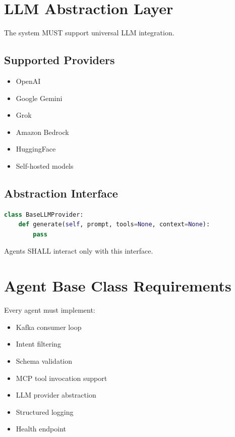 \documentclass[12pt]{article}
\begin{document}
\section{LLM Abstraction Layer}

The system MUST support universal LLM integration.

\subsection{Supported Providers}

\begin{itemize}
    \item OpenAI
    \item Google Gemini
    \item Grok
    \item Amazon Bedrock
    \item HuggingFace
    \item Self-hosted models
\end{itemize}

\subsection{Abstraction Interface}

\begin{lstlisting}[language=Python]
class BaseLLMProvider:
    def generate(self, prompt, tools=None, context=None):
        pass
\end{lstlisting}

Agents SHALL interact only with this interface.

\section{Agent Base Class Requirements}

Every agent must implement:

\begin{itemize}
    \item Kafka consumer loop
    \item Intent filtering
    \item Schema validation
    \item MCP tool invocation support
    \item LLM provider abstraction
    \item Structured logging
    \item Health endpoint
\end{itemize}
\end{document}
